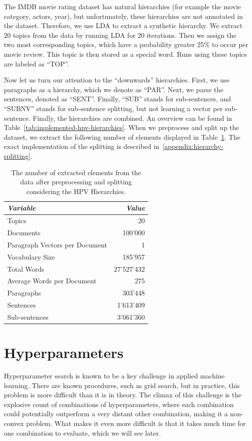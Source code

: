 The IMDB movie rating dataset has natural hierarchies (for example the movie category, actors, year), but unfortunately, these hierarchies are not annotated in the dataset. Therefore, we use LDA to extract a synthetic hierarchy. We extract 20 topics from the data by running LDA for 20 iterations. Then we assign the two most corresponding topics, which have a probability greater 25\% to occur per movie review. This topic is then stored as a special word. Runs using these topics are labeled as ``TOP''.

Now let us turn our attention to the ``downwards'' hierarchies. First, we use paragraphs as a hierarchy, which we denote as ``PAR''. Next, we parse the sentences, denoted as ``SENT''. Finally, ``SUB'' stands for sub-sentences, and ``SUBNV'' stands for sub-sentence splitting, but not learning a vector per sub-sentence. Finally, the hierarchies are combined. An overview can be found in Table~\ref{tab:implemented-hpv-hierarchies}. When we preprocess and split up the dataset, we extract the following number of elements displayed in Table~\ref{tab:5:extracted-elements}. The exact implementation of the splitting is described in~\ref{appendix:hierarchy-splitting}.

\begin{table}
	\centering
	\caption{The number of extracted elements from the data after preprocessing and splitting considering the HPV Hierarchies.}
	\label{tab:5:extracted-elements}
	\begin{tabular}{lr}
		\toprule
		\emph{Variable}& \emph{Value}\tabularnewline
		\midrule
		Topics& 20\tabularnewline
		Documents& 100'000\tabularnewline
		Paragraph Vectors per Document& 1\tabularnewline
		Vocabulary Size& 185'957\tabularnewline
		Total Words& 27'527'432\tabularnewline
		Average Words per Document& 275\tabularnewline
		Paragraphs& 303'448\tabularnewline
		Sentences& 1'613'409\tabularnewline
		Sub-sentences& 3'061'360\tabularnewline
		\bottomrule
	\end{tabular}
\end{table}


\section{Hyperparameters}\label{hyperparameters}

Hyperparameter search is known to be a key challenge in applied machine learning. There are known procedures, such as grid search, but in practice, this problem is more difficult than it is in theory. The climax of this challenge is the explosive count of combinations of hyperparameters, where each combination could potentially outperform a very distant other combination, making it a non-convex problem. What makes it even more difficult is that it takes much time for one combination to evaluate, which we will see later.

